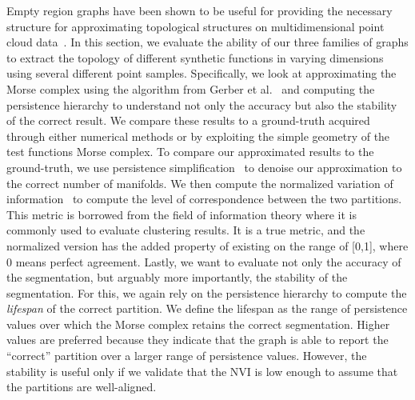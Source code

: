 Empty region graphs have been shown to be useful for providing the necessary structure for approximating topological structures on multidimensional point cloud data~\cite{BremerMaljovecSaha2015,CorreaLindstrom2011,LiebmannWeberScheuermann2018,MaljovecLiuWang2016,MaljovecWangRosen2016}.
%
In this section, we evaluate the ability of our three families of graphs to extract the topology of different synthetic functions in varying dimensions using several different point samples.
%
Specifically, we look at approximating the Morse complex using the algorithm from Gerber et al.~\cite{GerberBremerPascucci2010} and computing the persistence hierarchy to understand not only the accuracy but also the stability of the correct result.
%
We compare these results to a ground-truth acquired through either numerical methods or by exploiting the simple geometry of the test functions Morse complex.
%
To compare our approximated results to the ground-truth, we use persistence simplification~\cite{EdelsbrunnerLetscherZomorodian2002,EdelsbrunnerHarer2008} to denoise our approximation to the correct number of manifolds.
%
We then compute the normalized variation of information~\cite{VinhEppsBailey2010} to compute the level of correspondence between the two partitions.
%
This metric is borrowed from the field of information theory where it is commonly used to evaluate clustering results.
%
It is a true metric, and the normalized version has the added property of existing on the range of [0,1], where 0 means perfect agreement.
%
Lastly, we want to evaluate not only the accuracy of the segmentation, but arguably more importantly, the stability of the segmentation.
%
For this, we again rely on the persistence hierarchy to compute the \textit{lifespan} of the correct partition.
%
We define the lifespan as the range of persistence values over which the Morse complex retains the correct segmentation.
%
Higher values are preferred because they indicate that the graph is able to report the ``correct'' partition over a larger range of persistence values.
%
However, the stability is useful only if we validate that the NVI is low enough to assume that the partitions are well-aligned.

